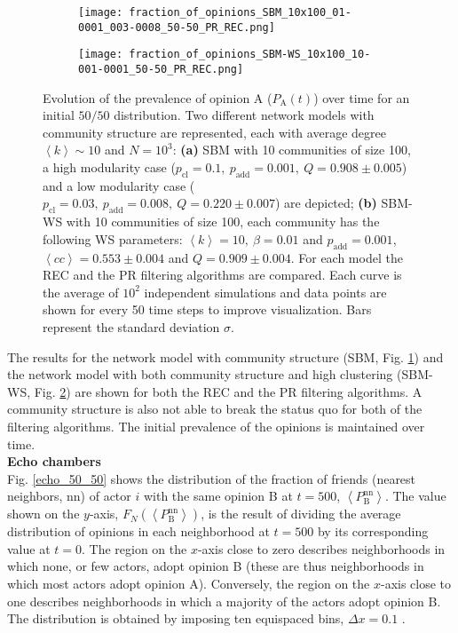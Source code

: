 \documentclass[11 pt , letterpaper , twoside , openright]{book}
\begin{document}
\begin{figure}[H]
  \begin{subfigure}[b]{0.49\textwidth}
    \caption{}
    \texttt{[image: fraction\_of\_opinions\_SBM\_10x100\_01-0001\_003-0008\_50-50\_PR\_REC.png]}
    \label{sbm_50-50}
  \end{subfigure}
  \begin{subfigure}[b]{0.49\textwidth}
    \caption{}
    \texttt{[image: fraction\_of\_opinions\_SBM-WS\_10x100\_10-001-0001\_50-50\_PR\_REC.png]}
    \label{sbm-ws_50-50}
  \end{subfigure}
  \captionsetup{format=plain}
  \caption[Evolution of the prevalence of opinion A ($P_{\text{A}}(t)$) over time for an initial $50/50$ opinion distribution.]{Evolution of the prevalence of opinion A ($P_{\text{A}}(t)$) over time for an initial $50/50$ distribution. Two different network models with community structure are represented, each with average degree $\left<k\right> \sim 10$ and $N = 10^3$: \textbf{(a)} SBM with 10 communities of size 100, a high modularity case ($p_{\text{cl}} = 0.1,\ p_{\text{add}} = 0.001,\ Q = 0.908 \pm 0.005$) and a low modularity case ($p_{\text{cl}} = 0.03,\ p_{\text{add}} = 0.008,\ Q = 0.220 \pm 0.007$) are depicted; \textbf{(b)} SBM-WS with 10 communities of size 100, each community has the following WS parameters: $\left<k\right> = 10,\ \beta = 0.01$ and $p_{\text{add}} = 0.001$, $\left<cc\right> = 0.553 \pm 0.004$ and $Q = 0.909 \pm 0.004$. For each model the REC and the PR filtering algorithms are compared. Each curve is the average of $10^2$ independent simulations and data points are shown for every 50 time steps to improve visualization. Bars represent the standard deviation $\sigma$.}
\label{ev_op_50_50}
\end{figure}
\noindent
The results for the network model with community structure (SBM, Fig. \ref{sbm_50-50}) and the network model with both community structure and high clustering (SBM-WS, Fig. \ref{sbm-ws_50-50}) are shown for both the REC and the PR filtering algorithms. A community structure is also not able to break the status quo for both of the filtering algorithms. The initial prevalence of the opinions is maintained over time.\\
\newline
\textbf{Echo chambers}\\
\newline
Fig. \ref{echo_50_50} shows the distribution of the fraction of friends (nearest neighbors, nn) of actor $i$ with the same opinion B at $t=500$, $\left<P_{\text{B}}^{\text{nn}}\right>$. The value shown on the $y$-axis, $F_N(\left<P_{\text{B}}^{\text{nn}}\right>)$, is the result of dividing the average distribution of opinions in each neighborhood at $t=500$ by its corresponding value at $t=0$. The region on the $x$-axis close to zero describes neighborhoods in which none, or few actors, adopt opinion B (these are thus neighborhoods in which most actors adopt opinion A). Conversely, the region on the $x$-axis close to one describes neighborhoods in which a majority of the actors adopt opinion B. The distribution is obtained by imposing ten equispaced bins, $\Delta x = 0.1$ \cite{Perra2019}. 
\end{document}
